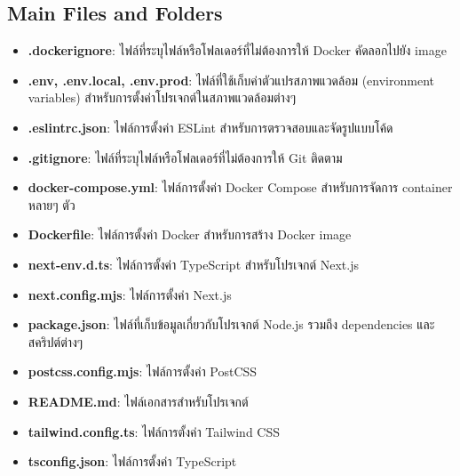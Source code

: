 \subsection{Main Files and Folders}
\begin{itemize}
    \item \textbf{.dockerignore}: ไฟล์ที่ระบุไฟล์หรือโฟลเดอร์ที่ไม่ต้องการให้ Docker คัดลอกไปยัง image
    \item \textbf{.env, .env.local, .env.prod}: ไฟล์ที่ใช้เก็บค่าตัวแปรสภาพแวดล้อม (environment variables) สำหรับการตั้งค่าโปรเจกต์ในสภาพแวดล้อมต่างๆ
    \item \textbf{.eslintrc.json}: ไฟล์การตั้งค่า ESLint สำหรับการตรวจสอบและจัดรูปแบบโค้ด
    \item \textbf{.gitignore}: ไฟล์ที่ระบุไฟล์หรือโฟลเดอร์ที่ไม่ต้องการให้ Git ติดตาม
    \item \textbf{docker-compose.yml}: ไฟล์การตั้งค่า Docker Compose สำหรับการจัดการ container หลายๆ ตัว
    \item \textbf{Dockerfile}: ไฟล์การตั้งค่า Docker สำหรับการสร้าง Docker image
    \item \textbf{next-env.d.ts}: ไฟล์การตั้งค่า TypeScript สำหรับโปรเจกต์ Next.js
    \item \textbf{next.config.mjs}: ไฟล์การตั้งค่า Next.js
    \item \textbf{package.json}: ไฟล์ที่เก็บข้อมูลเกี่ยวกับโปรเจกต์ Node.js รวมถึง dependencies และสคริปต์ต่างๆ
    \item \textbf{postcss.config.mjs}: ไฟล์การตั้งค่า PostCSS
    \item \textbf{README.md}: ไฟล์เอกสารสำหรับโปรเจกต์
    \item \textbf{tailwind.config.ts}: ไฟล์การตั้งค่า Tailwind CSS
    \item \textbf{tsconfig.json}: ไฟล์การตั้งค่า TypeScript
\end{itemize}


